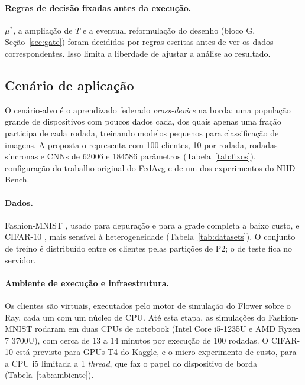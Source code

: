 \paragraph{Regras de decisão fixadas antes da execução.} $\mu^*$, a ampliação de $T$ e a eventual reformulação do desenho (bloco G, Seção~\ref{sec:gate}) foram decididos por regras escritas antes de ver os dados correspondentes. Isso limita a liberdade de ajustar a análise ao resultado.

\subsection{Cenário de aplicação}
\label{sec:aplicacao}

O cenário-alvo é o aprendizado federado \textit{cross-device} na borda: uma população grande de dispositivos com poucos dados cada, dos quais apenas uma fração participa de cada rodada, treinando modelos pequenos para classificação de imagens. A proposta o representa com 100 clientes, 10 por rodada, rodadas síncronas e CNNs de \num{62006} e \num{184586} parâmetros (Tabela~\ref{tab:fixos}), configuração do trabalho original do FedAvg \citep{mcmahan2017fedavg} e de um dos experimentos do NIID-Bench.

\paragraph{Dados.} Fashion-MNIST \citep{xiao2017fashion}, usado para depuração e para a grade completa a baixo custo, e CIFAR-10 \citep{krizhevsky2009cifar}, mais sensível à heterogeneidade (Tabela~\ref{tab:datasets}). O conjunto de treino é distribuído entre os clientes pelas partições de P2; o de teste fica no servidor.

\paragraph{Ambiente de execução e infraestrutura.} Os clientes são virtuais, executados pelo motor de simulação do Flower sobre o Ray, cada um com um núcleo de CPU. Até esta etapa, as simulações do Fashion-MNIST rodaram em duas CPUs de notebook (Intel Core i5-1235U e AMD Ryzen 7 3700U), com cerca de 13 a 14 minutos por execução de 100 rodadas. O CIFAR-10 está previsto para GPUs T4 do Kaggle, e o micro-experimento de custo, para a CPU i5 limitada a 1 \textit{thread}, que faz o papel do dispositivo de borda (Tabela~\ref{tab:ambiente}).

